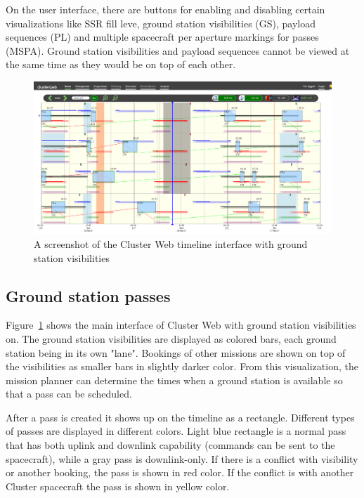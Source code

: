 On the user interface, there are buttons for enabling and disabling certain visualizations like SSR fill leve, ground station visibilities (GS), payload sequences (PL) and multiple spacecraft per aperture markings for passes (MSPA). Ground station visibilities and payload sequences cannot be viewed at the same time as they would be on top of each other.

\begin{figure}[ht]
  \begin{center}
    \includegraphics*[width=1\textwidth]{clusterweb_visibilities}
  \end{center}
  \caption{A screenshot of the Cluster Web timeline interface with ground station visibilities}
  \label{fig:clusterweb_visibilities}
\end{figure}

\subsection{Ground station passes}
Figure~\ref{fig:clusterweb_visibilities} shows the main interface of Cluster Web with ground station visibilities on. The ground station visibilities are displayed as colored bars, each ground station being in its own "lane". Bookings of other missions are shown on top of the visibilities as smaller bars in slightly darker color. From this visualization, the mission planner can determine the times when a ground station is available so that a pass can be scheduled. 

After a pass is created it shows up on the timeline as a rectangle. Different types of passes are displayed in different colors. Light blue rectangle is a normal pass that has both uplink and downlink capability (commands can be sent to the spacecraft), while a gray pass is downlink-only. If there is a conflict with visibility or another booking, the pass is shown in red color. If the conflict is with another Cluster spacecraft the pass is shown in yellow color.

